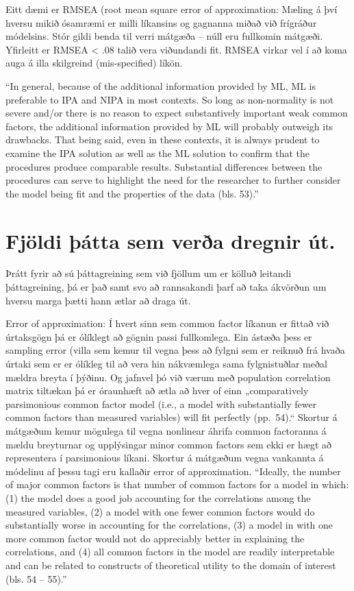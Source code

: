 \documentclass[]{book}
\begin{document}
Eitt dæmi er RMSEA (root mean square error of approximation: Mæling á því hversu mikið ósamræmi er milli líkansins og gagnanna miðað við frígráður módelsins. Stór gildi benda til verri mátgæða -- núll eru fullkomin mátgæði. Yfirleitt er RMSEA \textless{} .08 talið vera viðundandi fit. RMSEA virkar vel í að koma auga á illa skilgreind (mis-specified) líkön.

``In general, because of the additional information provided by ML, ML is preferable to IPA and NIPA in most contexts. So long as non-normality is not severe and/or there is no reason to expect substantively important weak common factors, the additional information provided by ML will probably outweigh its drawbacks. That being said, even in these contexts, it is always prudent to examine the IPA solution as well as the ML solution to confirm that the procedures produce comparable results. Substantial differences between the procedures can serve to highlight the need for the researcher to further consider the model being fit and the properties of the data (bls. 53).''

\hypertarget{fjuxf6ldi-uxfeuxe1tta-sem-veruxf0a-dregnir-uxfat.}{%
\section{Fjöldi þátta sem verða dregnir út.}\label{fjuxf6ldi-uxfeuxe1tta-sem-veruxf0a-dregnir-uxfat.}}

Þrátt fyrir að sú þáttagreining sem við fjöllum um er kölluð leitandi þáttagreining, þá er það samt svo að rannsakandi þarf að taka ákvörðun um hversu marga þætti hann ætlar að draga út.

Error of approximation: Í hvert sinn sem common factor líkanun er fittað við úrtaksgögn þá er ólíklegt að gögnin passi fullkomlega. Ein ástæða þess er sampling error (villa sem kemur til vegna þess að fylgni sem er reiknuð frá hvaða úrtaki sem er er ólíkleg til að vera hin nákvæmlega sama fylgnistuðlar meðal mældra breyta í þýðinu. Og jafnvel þó við værum með population correlation matrix tiltækan þá er óraunhæft að ætla að hver of einn „comparatively parsimonious common factor model (i.e., a model with substantially fewer common factors than measured variables) will fit perfectly (pp.~54).`` Skortur á mátgæðum kemur mögulega til vegna nonlinear áhrifa common factoranna á mældu breyturnar og upplýsingar minor common factors sem ekki er hægt að representera í parsimonious líkani. Skortur á mátgæðum vegna vankannta á módelinu af þessu tagi eru kallaðir error of approximation.
``Ideally, the number of major common factors is that number of common factors for a model in which:
(1) the model does a good job accounting for the correlations among the measured variables,
(2) a model with one fewer common factors would do substantially worse in accounting for the correlations,
(3) a model in with one more common factor would not do appreciably better in explaining the correlations, and
(4) all common factors in the model are readily interpretable and can be related to constructs of theoretical utility to the domain of interest (bls. 54 -- 55).''
\end{document}
